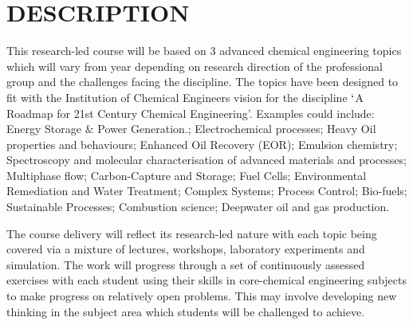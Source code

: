 \documentclass[12pts,a4paper,amsmath,amssymb,floatfix]{article}%
\begin{document}
\section{DESCRIPTION}
This research-led course will be based on 3 advanced chemical engineering topics which will vary from year depending on research direction of the professional group and the challenges facing the discipline. The topics have been designed to fit with the Institution of Chemical Engineers vision for the discipline $\lq$A Roadmap for 21st Century Chemical Engineering'.  Examples could include: Energy Storage $\&$ Power Generation.; Electrochemical processes; Heavy Oil properties and behaviours; Enhanced Oil Recovery (EOR); Emulsion chemistry; Spectroscopy and molecular characterisation of advanced materials and processes; Multiphase flow; Carbon-Capture and Storage; Fuel Cells; Environmental Remediation and Water Treatment; Complex Systems; Process Control; Bio-fuels; Sustainable Processes; Combustion science; Deepwater oil and gas production.

The course delivery will reflect its research-led nature with each topic being covered via a mixture of lectures, workshops, laboratory experiments and simulation. The work will progress through a set of continuously assessed exercises with each student using their skills in core-chemical engineering subjects to make progress on relatively open problems. This may involve developing new thinking in the subject area which students will be challenged to achieve.


\end{document}
